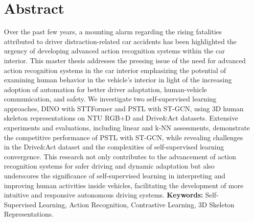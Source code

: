\documentclass[a4paper,openany]{scrbook}
\begin{document}
\pagestyle{headings}


\chapter*{Abstract}

Over the past few years, a mounting alarm regarding the rising fatalities attributed to driver distraction-related car accidents has been highlighted the urgency of developing advanced action recognition systems within the car interior. This master thesis addresses the pressing issue of the need for advanced action recognition systems in the car interior emphasizing the potential of examining human behavior in the vehicle's interior in light of the increasing adoption of automation for better driver adaptation, human-vehicle communication, and safety. We investigate two self-supervised learning approaches, DINO with STTFormer and PSTL with ST-GCN, using 3D human skeleton representations on NTU RGB+D and Drive\&Act datasets. Extensive experiments and evaluations, including linear and k-NN assessments, demonstrate the competitive performance of  PSTL with ST-GCN, while revealing challenges in the Drive\&Act dataset and the complexities of self-supervised learning convergence. This research not only contributes to the advancement of action recognition systems for safer driving and dynamic adaptation but also underscores the significance of self-supervised learning in interpreting and improving human activities inside vehicles, facilitating the development of more intuitive and responsive autonomous driving systems.\newline
\newline
\textbf{Keywords:} Self-Supervised Learning, Action Recognition, Contrastive Learning, 3D Skeleton Representations.
\newpage

\tableofcontents
\newpage

\chapter*{}
\listoffigures
{}
\let\cleardoublepage\clearpage

\let\cleardoublepage\clearpage
\chapter*{}
\listoftables
\let\cleardoublepage\clearpage
\end{document}
